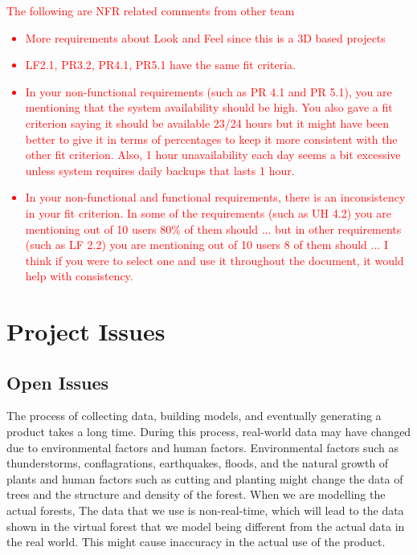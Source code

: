 \documentclass{article}
\begin{document}
\textcolor{red}{
The following are NFR related comments from other team
\begin{itemize}
\item More requirements about Look and Feel since this is a 3D based projects
\item LF2.1, PR3.2, PR4.1, PR5.1 have the same fit criteria.
\item In your non-functional requirements (such as PR 4.1 and PR 5.1), you are mentioning that the system availability should be high. You also gave a fit criterion saying it should be available 23/24 hours but it might have been better to give it in terms of percentages to keep it more consistent with the other fit criterion. Also, 1 hour unavailability each day seems a bit excessive unless system requires daily backups that lasts 1 hour.
\item In your non-functional and functional requirements, there is an inconsistency in your fit criterion. In some of the requirements (such as UH 4.2) you are mentioning out of 10 users 80\% of them should ... but in other requirements (such as LF 2.2) you are mentioning out of 10 users 8 of them should ... I think if you were to select one and use it throughout the document, it would help with consistency.
\end{itemize} 
}




\section{Project Issues}
\subsection{Open Issues}
The process of collecting data, building models, and eventually generating a product takes a long time. During this process, real-world data may have changed due to environmental factors and human factors. Environmental factors such as thunderstorms, conflagrations, earthquakes, floods, and the natural growth of plants and human factors such as cutting and planting might change the data of trees and the structure and density of the forest. When we are modelling the actual forests, The data that we use is non-real-time, which will lead to the data shown in the virtual forest that we model being different from the actual data in the real world. This might cause inaccuracy in the actual use of the product.
\end{document}
